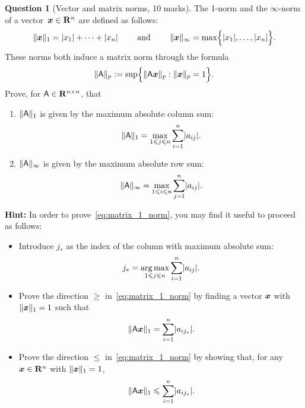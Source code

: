 \documentclass[11pt]{article}
\theoremstyle{definition}
\newtheorem{question}{Question}
\theoremstyle{remark}
\begin{document}
\newpage
\begin{question}
    [Vector and matrix norms, 10 marks]
    The 1-norm and the $\infty$-norm of a vector~$\mathbf{\boldsymbol{x}} \in \mathbf R^n$ are defined as follows:
    \[
        \lVert\mathbf{\boldsymbol{x}}\rVert_1 = \lvert x_1 \rvert + \dotsb + \lvert x_n \rvert
        \qquad \text{ and } \qquad
        \lVert\mathbf{\boldsymbol{x}}\rVert_{\infty} = \max \Bigl\{ \lvert x_1 \rvert, \dotsc, \lvert x_n \rvert \Bigr\}.
    \]
    These norms both induce a matrix norm through the formula
    \[
        \lVert\mathsf A\rVert_p
        := \sup \Bigl\{ \lVert\mathsf A \mathbf{\boldsymbol{x}}\rVert_p : \lVert\mathbf{\boldsymbol{x}}\rVert_p = 1 \Bigr\}.
    \]
    Prove, for $\mathsf A \in \mathbf R^{n \times n}$, that
    \begin{enumerate}
        \item
            $\lVert\mathsf A\rVert_1$ is given by the maximum absolute column sum:
            \begin{equation}
                \label{eq:matrix_1_norm}
               \lVert\mathsf A\rVert_1 = \max_{1 \leqslant j \leqslant n}  \sum_{i=1}^{n} \lvert a_{ij}\rvert.
            \end{equation}

        \item
            $\lVert\mathsf A\rVert_{\infty}$ is given by the maximum absolute row sum:
            \[
                \lVert\mathsf A\rVert_{\infty} = \max_{1 \leqslant i \leqslant n}  \sum_{j=1}^{n} \lvert a_{ij}\rvert.
            \]
    \end{enumerate}

    \textbf{Hint:} In order to prove~\eqref{eq:matrix_1_norm},
    you may find it useful to proceed as follows:
    \begin{itemize}
        \item
            Introduce $j_*$ as the index of the column with maximum absolute sum:
            \[
                j_* = \operatorname*{arg\,max}_{1 \leqslant j \leqslant n}  \sum_{i=1}^{n} \lvert a_{ij}\rvert.
            \]
        \item
            Prove the direction $\geq$ in~\eqref{eq:matrix_1_norm} by finding a vector $\mathbf{\boldsymbol{x}}$ with $\lVert\mathbf{\boldsymbol{x}}\rVert_1 = 1$ such that
            \[
                \lVert\mathsf A \mathbf{\boldsymbol{x}}\rVert_1 =  \sum_{i=1}^{n} \lvert a_{ij_*}\rvert.
            \]

        \item
            Prove the direction $\leq$ in~\eqref{eq:matrix_1_norm} by showing that,
            for any $\mathbf{\boldsymbol{x}} \in \mathbf R^n$ with $\lVert\mathbf{\boldsymbol{x}}\rVert_1 = 1$,
            \[
               \lVert\mathsf A \mathbf{\boldsymbol{x}}\rVert_1 \leqslant  \sum_{i=1}^{n} \lvert a_{ij_*}\rvert.
           \]
    \end{itemize}
\end{question}
\end{document}
